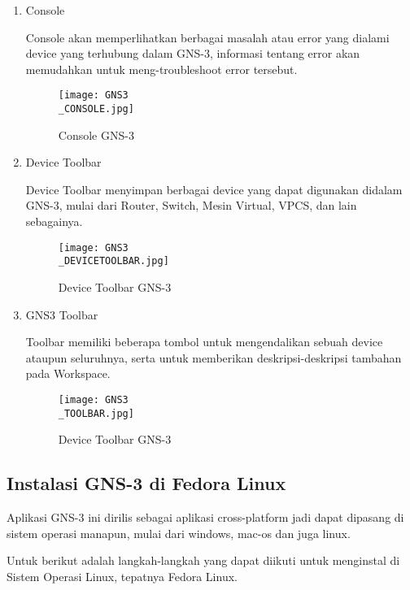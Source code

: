 \documentclass[12pt, a4paper]{article}
\begin{document}
\begin{enumerate}[label=\arabic*.]
        \item Console

          Console akan memperlihatkan berbagai masalah atau error yang dialami
          device yang terhubung dalam GNS-3, informasi tentang error akan memudahkan
          untuk meng-troubleshoot error tersebut.

          \begin{figure}[h]
              \centering
              \texttt{[image: GNS3\\\_CONSOLE.jpg]}
              \caption{\small{Console GNS-3}}
          \end{figure}

        \newpage

        \item Device Toolbar

          Device Toolbar menyimpan berbagai device yang dapat digunakan didalam
          GNS-3, mulai dari Router, Switch, Mesin Virtual, VPCS, dan lain sebagainya.

          \begin{figure}[h]
              \centering
              \texttt{[image: GNS3\\\_DEVICETOOLBAR.jpg]}
              \caption{\small{Device Toolbar GNS-3}}
          \end{figure}

        \item GNS3 Toolbar

          Toolbar memiliki beberapa tombol untuk mengendalikan sebuah device ataupun
          seluruhnya, serta untuk memberikan deskripsi-deskripsi tambahan pada Workspace.

          \begin{figure}[h]
              \centering
              \texttt{[image: GNS3\\\_TOOLBAR.jpg]}
              \caption{\small{Device Toolbar GNS-3}}
          \end{figure}


      \end{enumerate}

    \subsection{Instalasi GNS-3 di Fedora Linux}

      Aplikasi GNS-3 ini dirilis sebagai aplikasi cross-platform jadi dapat
      dipasang di sistem operasi manapun, mulai dari windows, mac-os dan
      juga linux.

      Untuk berikut adalah langkah-langkah yang dapat diikuti untuk menginstal
      di Sistem Operasi Linux, tepatnya Fedora Linux.
\end{document}
